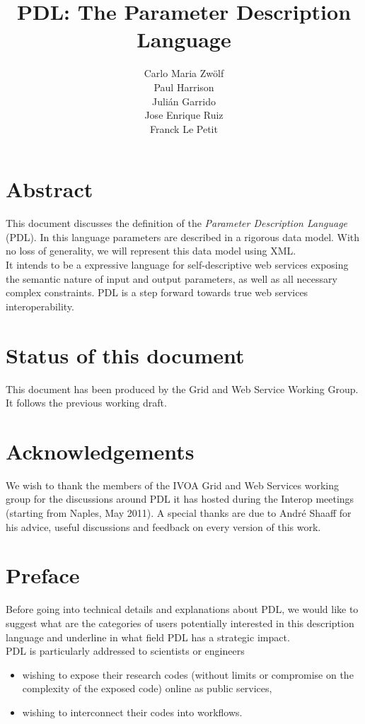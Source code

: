 \documentclass[a4paper,11pt] {ivoa}
\title{PDL: The Parameter Description Language}
\author{Carlo Maria Zw\"olf \\ Paul Harrison \\ Juli\'an Garrido \\ Jose Enrique Ruiz \\ Franck Le Petit}
\date{\pdldate}
\begin{document}
\maketitle
\section*{Abstract}
This document discusses the definition of the  {\it Parameter Description Language} (PDL). In this language parameters are described in a rigorous data model. With no loss of generality, we will represent this data model using XML.\\
It intends to be a expressive language for self-descriptive web services exposing the semantic nature of input and output parameters, as well as all necessary complex constraints. PDL is a step forward towards true web services interoperability. 
\section{Status of this document}
This document has been produced by the Grid and Web Service Working Group. It follows the previous working draft.
 
\section*{Acknowledgements}
We wish to thank the members of the IVOA Grid and Web Services working group for the discussions around PDL it has hosted during the Interop meetings (starting from Naples, May 2011). A special thanks are due to Andr\'e Shaaff for his advice, useful discussions and feedback on every version of this work.

\clearpage

\tableofcontents

\newpage

\section{Preface}
Before going into technical details and explanations about PDL, we would like to suggest what are the categories of users potentially interested in this description language and underline in what field PDL has a strategic impact.\\

\noindent PDL is particularly addressed to scientists or engineers
\begin{itemize}
\item wishing to expose their research codes (without limits or compromise on the complexity of the exposed code) online as public services,
\item wishing to interconnect their codes into workflows.
\end{itemize}
\end{document}
